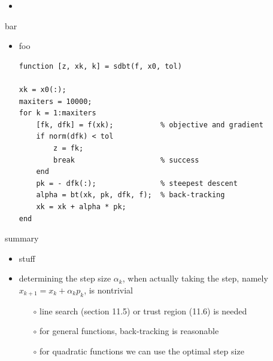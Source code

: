\documentclass[10pt,hyperref]{beamer}
\begin{document}
\begin{frame}{}

\begin{itemize}
\item 
\end{itemize}
\end{frame}


\begin{frame}[fragile]{bar}

\begin{itemize}
\item foo
\begin{Verbatim}[fontsize=\small]
function [z, xk, k] = sdbt(f, x0, tol)

xk = x0(:);
maxiters = 10000;
for k = 1:maxiters
    [fk, dfk] = f(xk);           % objective and gradient
    if norm(dfk) < tol
        z = fk;
        break                    % success
    end
    pk = - dfk(:);               % steepest descent
    alpha = bt(xk, pk, dfk, f);  % back-tracking
    xk = xk + alpha * pk;
end
\end{Verbatim}
\end{itemize}
\end{frame}





\begin{frame}{summary}

\begin{itemize}
\item stuff
\item determining the step size $\alpha_k$, when actually taking the step, namely $x_{k+1}=x_k + \alpha_k p_k$, is nontrivial
    \begin{itemize}
    \item[$\circ$] line search (section 11.5) or trust region (11.6) is needed
    \item[$\circ$] for general functions, back-tracking is reasonable
    \item[$\circ$] for quadratic functions we can use the optimal step size
    \end{itemize}
\end{itemize}
\end{frame}
\end{document}
